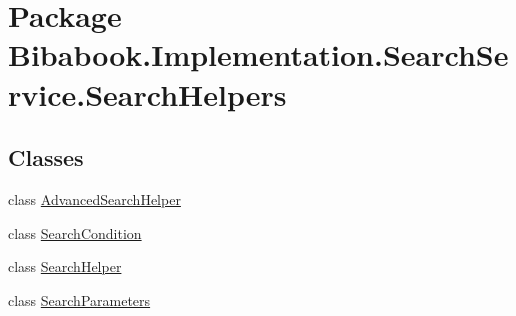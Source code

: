 \hypertarget{namespace_bibabook_1_1_implementation_1_1_search_service_1_1_search_helpers}{}\section{Package Bibabook.\+Implementation.\+Search\+Service.\+Search\+Helpers}
\label{namespace_bibabook_1_1_implementation_1_1_search_service_1_1_search_helpers}
\subsection*{Classes}
\begin{DoxyCompactItemize}
\item 
class \hyperlink{class_bibabook_1_1_implementation_1_1_search_service_1_1_search_helpers_1_1_advanced_search_helper}{Advanced\+Search\+Helper}
\item 
class \hyperlink{class_bibabook_1_1_implementation_1_1_search_service_1_1_search_helpers_1_1_search_condition}{Search\+Condition}
\item 
class \hyperlink{class_bibabook_1_1_implementation_1_1_search_service_1_1_search_helpers_1_1_search_helper}{Search\+Helper}
\item 
class \hyperlink{class_bibabook_1_1_implementation_1_1_search_service_1_1_search_helpers_1_1_search_parameters}{Search\+Parameters}
\end{DoxyCompactItemize}
